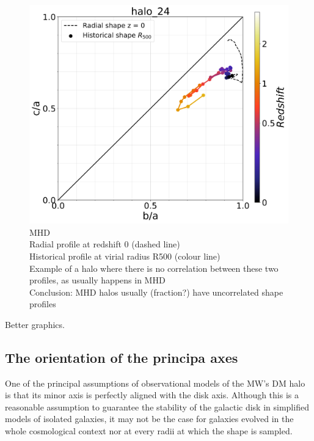 \documentclass[a4paper,fleqn,usenatbib]{mnras}
\begin{document}
\begin{figure}
	\includegraphics[width=\columnwidth]{./pics/Redshift/halo_24_level3_MHD_Z_Triax.png}
    \caption{MHD\\
    		 Radial profile at redshift 0 (dashed line)\\
    		 Historical profile at virial radius R500 (colour line)\\
    		 Example of a halo where there is no correlation between these two profiles, as usually happens in MHD\\
    		 Conclusion: MHD halos usually (fraction?) have uncorrelated shape profiles 
    		 } 
    \label{fig:MHD Z Triax} 
\end{figure}

Better graphics.



\subsection{The orientation of the principa axes}

One of the principal assumptions of observational models of the MW's
DM halo is that its minor axis is perfectly aligned with the disk
axis. Although this is a reasonable assumption to guarantee the
stability of the galactic disk in simplified models of isolated
galaxies, it may not be the case for galaxies evolved in the whole
cosmological context nor at every radii at which the shape is
sampled. 
\end{document}
